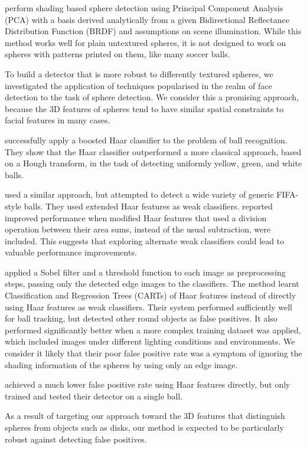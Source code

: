 \documentclass{sig-alternate-05-2015}
\newcommand{\citep}[1]{\cite{#1}}
\newcommand{\citet}[1]{\cite{#1}}
\begin{document}
{		\citet{nillius2008shading} perform shading based sphere detection using Principal Component Analysis (PCA) with a basis derived analytically from a given Bidirectional Reflectance Distribution Function (BRDF) and assumptions on scene illumination. While this method works well for plain untextured spheres, it is
		not designed to work on spheres with patterns printed on them, like many soccer balls.

		To build a detector that is more robust to differently textured spheres, we investigated the application of techniques popularised in the realm of face detection to the task of sphere detection. We consider this a promising approach, because the 3D features of spheres tend to have similar spatial constraints to facial features in many cases.


		\citet{masselli2013haar} successfully apply a boosted Haar classifier \citep{viola2001robust} to the problem of ball recognition. They show that the Haar classifier outperformed a more classical approach, based on a Hough transform, in the task of detecting uniformly yellow, green, and white balls.

		\citet{zhang2013novel} used a similar approach, but attempted to detect a wide variety of generic FIFA-style balls. They used extended Haar features \citep{Lienhart2002extended} as weak classifiers. \citet{zhang2013novel} reported improved performance when modified Haar features that used a division operation between their area sums, instead of the usual subtraction, were included. This suggests that exploring alternate weak classifiers could lead to valuable performance improvements.

		\citet{mitri2004fast} applied a Sobel filter and a threshold function to each image as preprocessing steps, passing only the detected edge images to the classifiers. The method learnt Classification and Regression Trees (CARTs) of Haar features instead of directly using Haar features as weak classifiers. Their system performed sufficiently well for ball tracking, but detected other round objects as false positives. It also performed significantly better when a more complex training dataset was applied, which included images under different lighting conditions and environments. We consider it likely that their poor false positive rate was a symptom of ignoring the shading information of the spheres by using only an edge image.

		\citet{treptow2004filter} achieved a much lower false positive rate using Haar features directly, but only trained and tested their detector on a single ball.

		As a result of targeting our approach toward the 3D features that distinguish spheres from objects such as disks, our method is expected to be particularly robust against detecting false positives.

	}
\end{document}
